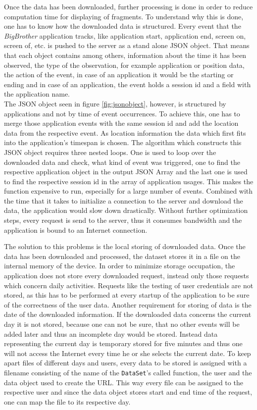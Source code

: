 Once  the data has been downloaded, further processing is done in order to reduce computation time for displaying of fragments. To understand why this is done, one has to know how the downloaded data is structured. Every event that the \emph{BigBrother} application tracks, like application start, application end, screen on, screen of, etc. is pushed to the server as a stand alone JSON object. That means that each object contains among others, information about the time it has been observed, the type of the observation, for example application or position data, the action of the event, in case of an application it would be the starting or ending and in case of an application, the event holds a session id and a field with the application name.\\
The JSON object seen in figure \ref{fig:jsonobject}, however, is structured by applications and not by time of event occurrences. To achieve this, one has to merge those application events with the same session id and add the location data from the respective event. As location information the data which first fits into the application's timespan is chosen. The algorithm which constructs this JSON object requires three nested loops. One is used to loop over the downloaded  data and check, what kind of event was triggered, one to find the respective application object in the output JSON Array and the last one is used to find the respective session id in the array of application usages. This makes the function expensive to run, especially for a large number of events. Combined with the time that it takes to initialize a connection to the server and download the data, the application would slow down drastically. Without further optimization steps, every request is send to the server, thus it consumes bandwidth and the application is bound to an Internet connection.

The  solution to this problems is the local storing of downloaded data. Once the data has been downloaded and processed, the dataset stores it in a file on the internal memory of the device. In order to minimize storage occupation, the application does not store every downloaded request, instead only those requests which concern daily activities. Requests like the testing of user credentials are not stored, as this has to be performed at every startup of the application to be sure of the correctness of the user data. Another requirement for storing of data is the date of the downloaded information. If the downloaded data concerns the current day it is not stored, because one can not be sure, that no other events will be added later and thus an incomplete day would be stored. Instead data representing the current day is temporary stored for five minutes and thus one will not access the Internet every time he or she selects the current date.
To keep apart files of different days and users, every data to be stored is assigned with a filename consisting of the name of the \lstinline$DataSet$'s called function, the user and the data object used to create the URL. This way every file can be assigned to the respective user and since the data object stores start and end time of the request, one can map the file to its respective day.

